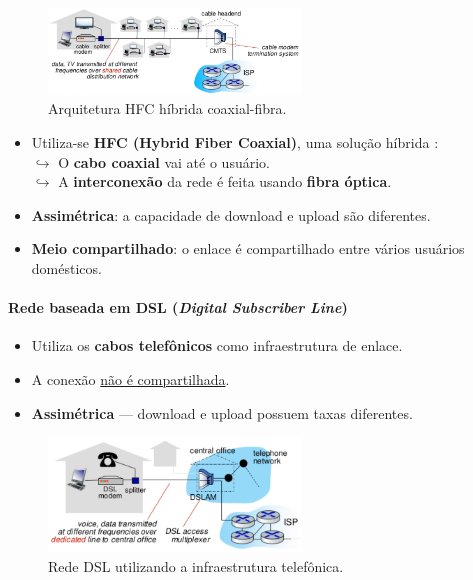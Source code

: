     \begin{figure}[H]
        \centering
        \includegraphics[width=0.6\textwidth]{img/cap-01/tv-a-cabo2.png}
        \caption{Arquitetura HFC híbrida coaxial-fibra.}
    \end{figure}

    \begin{itemize}
        \item Utiliza-se \textbf{HFC (Hybrid Fiber Coaxial)}, uma solução híbrida : \\
            $\hookrightarrow$ O \textbf{cabo coaxial} vai até o usuário. \\
            $\hookrightarrow$ A \textbf{interconexão} da rede é feita usando \textbf{fibra óptica}.
        \item \textbf{Assimétrica}: a capacidade de download e upload são diferentes.
        \item \textbf{Meio compartilhado}: o enlace é compartilhado entre vários usuários domésticos.
    \end{itemize}

    \paragraph{Rede baseada em DSL (\textit{Digital Subscriber Line})}
    \begin{itemize}
        \item Utiliza os \textbf{cabos telefônicos} como infraestrutura de enlace.
        \item A conexão \underline{não é compartilhada}.
        \item \textbf{Assimétrica} — download e upload possuem taxas diferentes.
    \end{itemize}

    \begin{figure}[H]
        \centering
        \includegraphics[width=0.6\textwidth]{img/cap-01/dsl.png}
        \caption{Rede DSL utilizando a infraestrutura telefônica.}
    \end{figure}

